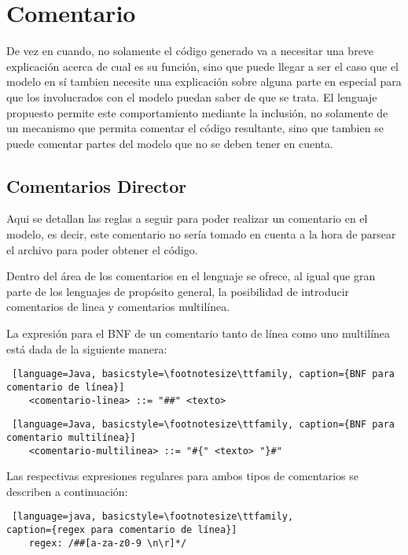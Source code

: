 \section{Comentario}
\label{sec:comentario}
De vez en cuando, no solamente el código generado va a necesitar una breve
explicación acerca de cual es su función, sino que puede llegar a ser el caso
que el modelo en sí tambien necesite una explicación sobre alguna parte en
especial para que los involucrados con el modelo puedan saber de que se trata.
El lenguaje propuesto permite este comportamiento mediante la inclusión, no
solamente de un mecanismo que permita comentar el código resultante, sino que
tambien se puede comentar  partes del modelo que no se deben tener en cuenta.

\subsection{Comentarios Director}
\label{sub:comentariosdrt}
Aqui se detallan las reglas a seguir para poder realizar un comentario en el
modelo, es decir, este comentario no sería tomado en cuenta a la hora de
parsear el archivo para poder obtener el código.

Dentro del área de los comentarios en el lenguaje se ofrece, al igual que gran
parte de los lenguajes de propósito general, la posibilidad de introducir
comentarios de linea y comentarios multilínea.

La expresión para el BNF de un comentario tanto de línea como uno multilínea
está dada de la siguiente manera:

\begin{lstlisting} [language=Java, basicstyle=\footnotesize\ttfamily, caption={BNF para
comentario de línea}]
	<comentario-linea> ::= "##" <texto>
\end{lstlisting}

\begin{lstlisting} [language=Java, basicstyle=\footnotesize\ttfamily, caption={BNF para
comentario multilínea}]
	<comentario-multilinea> ::= "#{" <texto> "}#"
\end{lstlisting}

Las respectivas expresiones regulares para ambos tipos de comentarios se
describen a continuación:

\begin{lstlisting} [language=java, basicstyle=\footnotesize\ttfamily,
caption={regex para comentario de línea}]
	regex: /##[a-za-z0-9 \n\r]*/
\end{lstlisting}


